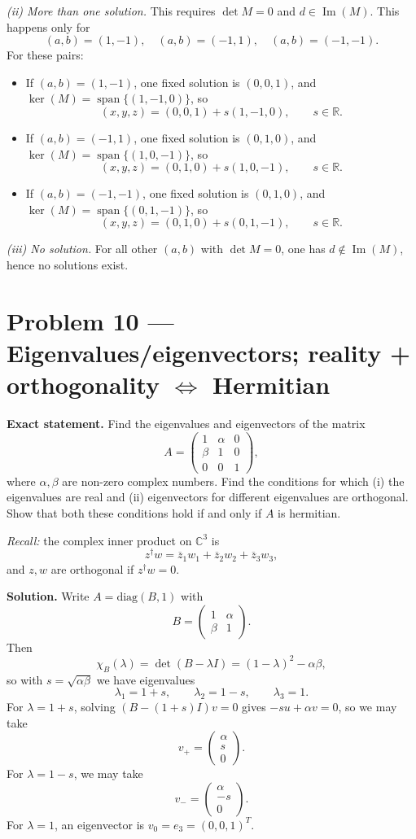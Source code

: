 \documentclass[12pt,a4paper]{article}
\theoremstyle{plain}
\theoremstyle{definition}      %
\begin{document}
\emph{(ii) More than one solution.}
This requires \(\det M=0\) and \(d\in\operatorname{Im}(M)\). This happens only for
\[
(a,b)=(1,-1),\quad (a,b)=(-1,1),\quad (a,b)=(-1,-1).
\]
For these pairs:
\begin{itemize}
	\item If \((a,b)=(1,-1)\), one fixed solution is \((0,0,1)\), and \(\ker(M)=\operatorname{span}\{(1,-1,0)\}\), so
	\[
	(x,y,z)=(0,0,1)+s(1,-1,0),\qquad s\in\mathbb R.
	\]
	\item If \((a,b)=(-1,1)\), one fixed solution is \((0,1,0)\), and \(\ker(M)=\operatorname{span}\{(1,0,-1)\}\), so
	\[
	(x,y,z)=(0,1,0)+s(1,0,-1),\qquad s\in\mathbb R.
	\]
	\item If \((a,b)=(-1,-1)\), one fixed solution is \((0,1,0)\), and \(\ker(M)=\operatorname{span}\{(0,1,-1)\}\), so
	\[
	(x,y,z)=(0,1,0)+s(0,1,-1),\qquad s\in\mathbb R.
	\]
\end{itemize}

\emph{(iii) No solution.}
For all other \((a,b)\) with \(\det M=0\), one has \(d\notin \operatorname{Im}(M)\), hence no solutions exist.


\section*{Problem 10 — Eigenvalues/eigenvectors; reality + orthogonality \(\Leftrightarrow\) Hermitian}

\textbf{Exact statement.}
Find the eigenvalues and eigenvectors of the matrix
\[
A=\begin{pmatrix}
	1&\alpha&0\\
	\beta&1&0\\
	0&0&1
\end{pmatrix},
\]
where \(\alpha,\beta\) are non-zero complex numbers. Find the conditions for which
(i) the eigenvalues are real and
(ii) eigenvectors for different eigenvalues are orthogonal.
Show that both these conditions hold if and only if \(A\) is hermitian.

\emph{Recall:} the complex inner product on \(\mathbb C^3\) is
\[
z^\dagger w=\overline z_1 w_1+\overline z_2 w_2+\overline z_3 w_3,
\]
and \(z,w\) are orthogonal if \(z^\dagger w=0\).

\textbf{Solution.}
Write \(A=\mathrm{diag}(B,1)\) with
\[
B=\begin{pmatrix}1&\alpha\\ \beta&1\end{pmatrix}.
\]
Then
\[
\chi_B(\lambda)=\det(B-\lambda I)=(1-\lambda)^2-\alpha\beta,
\]
so with \(s=\sqrt{\alpha\beta}\) we have eigenvalues
\[
\lambda_1=1+s,\qquad \lambda_2=1-s,\qquad \lambda_3=1.
\]
For \(\lambda=1+s\), solving \((B-(1+s)I)v=0\) gives \(-su+\alpha v=0\), so we may take
\[
v_+=\begin{pmatrix}\alpha\\ s\\ 0\end{pmatrix}.
\]
For \(\lambda=1-s\), we may take
\[
v_-=\begin{pmatrix}\alpha\\ -s\\ 0\end{pmatrix}.
\]
For \(\lambda=1\), an eigenvector is \(v_0=e_3=(0,0,1)^T\).
\end{document}
